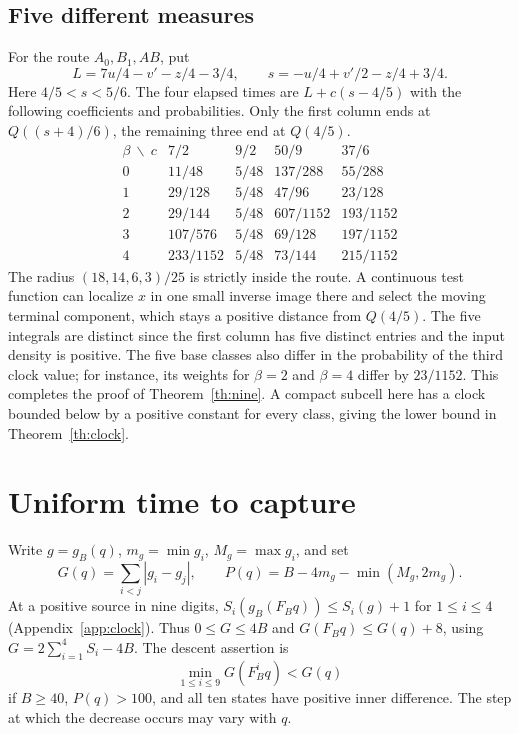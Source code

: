 \documentclass[11pt,reqno]{amsart}
\begin{document}
\subsection{Five different measures}
For the route $A_0,B_1,AB$, put
\[
 L=7u/4-v'-z/4-3/4,\qquad s=-u/4+v'/2-z/4+3/4.
\]
Here $4/5<s<5/6$. The four elapsed times are $L+c(s-4/5)$ with the
following coefficients and probabilities. Only the first column ends at
$Q((s+4)/6)$, the remaining three end at $Q(4/5)$.
\[
\begin{array}{c|rrrr}
\beta\ \backslash\ c&7/2&9/2&50/9&37/6\\\hline
0&11/48&5/48&137/288&55/288\\
1&29/128&5/48&47/96&23/128\\
2&29/144&5/48&607/1152&193/1152\\
3&107/576&5/48&69/128&197/1152\\
4&233/1152&5/48&73/144&215/1152
\end{array}
\]
The radius $(18,14,6,3)/25$ is strictly inside the route.
A continuous test function can localize $x$ in one small inverse image
there and select the moving terminal component, which stays a positive
distance from $Q(4/5)$. The five integrals are distinct since the first
column has five distinct entries and the input density is positive. The
five base classes also differ in the probability of the third clock value; for
instance, its weights for $\beta=2$ and $\beta=4$ differ by $23/1152$. This
completes the proof of Theorem~\ref{th:nine}. A compact subcell here has a
clock bounded below by a positive constant for every class, giving the
lower bound in Theorem~\ref{th:clock}.

\section{Uniform time to capture}\label{sec:capture}
Write $g=g_B(q)$, $m_g=\min g_i$, $M_g=\max g_i$, and set
\[
 G(q)=\sum_{i<j}|g_i-g_j|,\qquad P(q)=B-4m_g-\min(M_g,2m_g).
\]
At a positive source in nine digits,
$S_i(g_B(F_Bq))\le S_i(g)+1$ for $1\le i\le4$
(Appendix~\ref{app:clock}). Thus $0\le G\le4B$ and $G(F_Bq)\le G(q)+8$,
using $G=2\sum_{i=1}^4 S_i-4B$. The descent assertion is
\begin{equation}\label{eq:descent}
 \min_{1\le i\le9}G(F_B^iq)<G(q)
\end{equation}
if $B\ge40$, $P(q)>100$, and all ten states have positive inner
difference. The step at which the decrease occurs may vary with $q$.
\end{document}
